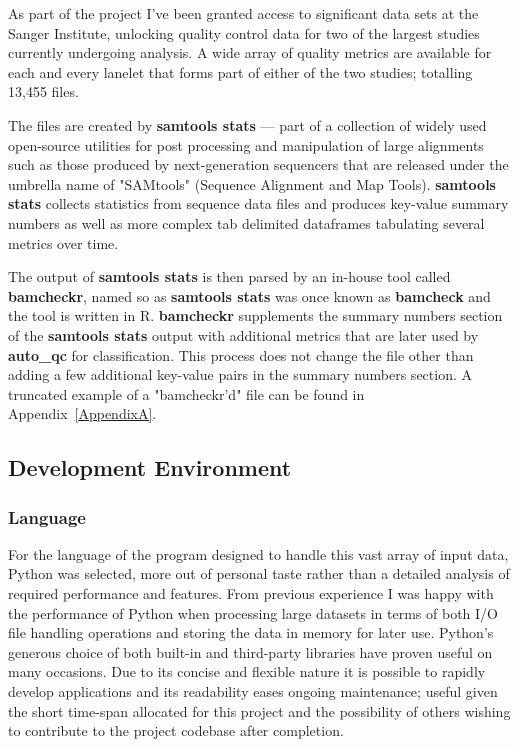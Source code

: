 As part of the project I've been granted access to significant data sets at the
Sanger Institute, unlocking quality control data for two of the largest studies
currently undergoing analysis. A wide array of quality metrics are available for
each and every lanelet that forms part of either of the two studies; totalling
13,455 files.


The files are created by \textbf{samtools stats} --- part of a collection of
widely used open-source utilities for post processing and manipulation of large
alignments such as those produced by next-generation sequencers that are
released under the umbrella name of "SAMtools" (Sequence Alignment and Map
Tools). \textbf{samtools stats} collects statistics from sequence data files %
and produces key-value summary numbers as well as more complex tab delimited
dataframes tabulating several metrics over time.

The output of \textbf{samtools stats} is then parsed by an in-house tool called
\textbf{bamcheckr}, named so as \textbf{samtools stats} was once known as
\textbf{bamcheck} and the tool is written in R. \textbf{bamcheckr} supplements
the summary numbers section of the \textbf{samtools stats} output with
additional metrics that are later used by \textbf{auto\_qc} for classification.
This process does not change the file other than adding a few additional
key-value pairs in the summary numbers section. A truncated example of a
"bamcheckr'd" file can be found in Appendix~\ref{AppendixA}.


\subsection{Development Environment}
\subsubsection{Language}
For the language of the program designed to handle this vast array of input
data, Python was selected, more out of personal taste rather than a
detailed analysis of required performance and features. From previous experience
I was happy with the performance of Python when processing large datasets in
terms of both I/O file handling operations and storing the data in memory for
later use. Python's generous choice of both built-in and third-party libraries
have proven useful on many occasions. Due to its concise and flexible nature it
is possible to rapidly develop applications and its readability eases ongoing
maintenance; useful given the short time-span allocated for this project and the
possibility of others wishing to contribute to the project codebase after
completion.

